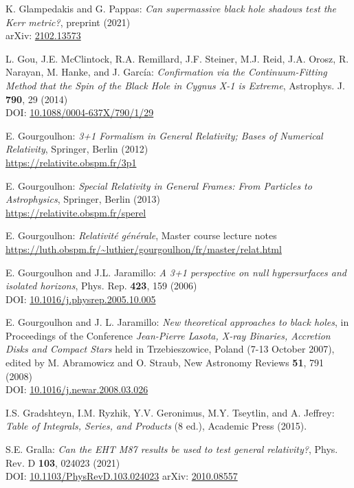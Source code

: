 \begin{thebibliography}{123}
K. Glampedakis and G. Pappas:
{\em Can supermassive black hole shadows test the Kerr metric?},
preprint (2021)\\
arXiv: \href{https://arxiv.org/abs/2102.13573}{2102.13573}

L. Gou, J.E. McClintock, R.A. Remillard, J.F. Steiner, M.J. Reid, J.A. Orosz, R. Narayan, M. Hanke, and J. García:
{\em Confirmation via the Continuum-Fitting Method that the Spin of the Black Hole in Cygnus X-1 is Extreme},
Astrophys. J. {\bf 790}, 29 (2014)\\
DOI: \href{https://doi.org/10.1088/0004-637X/790/1/29}{10.1088/0004-637X/790/1/29}

E. Gourgoulhon: {\em 3+1 Formalism in General Relativity; Bases of Numerical Relativity},
Springer, Berlin (2012)\\
\url{https://relativite.obspm.fr/3p1}

E. Gourgoulhon: {\em Special Relativity in General Frames: From Particles to Astrophysics},
Springer, Berlin (2013) \\
\url{https://relativite.obspm.fr/sperel}

E. Gourgoulhon: {\em Relativit\'e g\'en\'erale},
Master course lecture notes\\
\url{https://luth.obspm.fr/~luthier/gourgoulhon/fr/master/relat.html}

E. Gourgoulhon and J.L. Jaramillo: {\em A 3+1 perspective on null hypersurfaces and isolated horizons},
Phys. Rep. {\bf 423}, 159 (2006)\\
DOI: \href{https://doi.org/10.1016/j.physrep.2005.10.005}{10.1016/j.physrep.2005.10.005}

E. Gourgoulhon and J. L. Jaramillo: {\em New theoretical approaches to black holes},
in Proceedings of the Conference {\em Jean-Pierre Lasota, X-ray Binaries, Accretion Disks and Compact Stars} held in Trzebieszowice, Poland (7-13 October 2007), edited by M. Abramowicz and O. Straub, New Astronomy Reviews {\bf 51}, 791 (2008) \\
DOI: \href{https://doi.org/10.1016/j.newar.2008.03.026}{10.1016/j.newar.2008.03.026}

I.S. Gradshteyn, I.M. Ryzhik, Y.V. Geronimus, M.Y. Tseytlin, and A. Jeffrey:
{\em  Table of Integrals, Series, and Products} (8 ed.),
Academic Press (2015).

S.E. Gralla:
{\em Can the EHT M87 results be used to test general relativity?},
Phys. Rev. D {\bf 103}, 024023 (2021)\\
DOI: \href{https://doi.org/10.1103/PhysRevD.103.024023}{10.1103/PhysRevD.103.024023}\hfill
arXiv: \href{https://arxiv.org/abs/2010.08557}{2010.08557}


\end{thebibliography}
